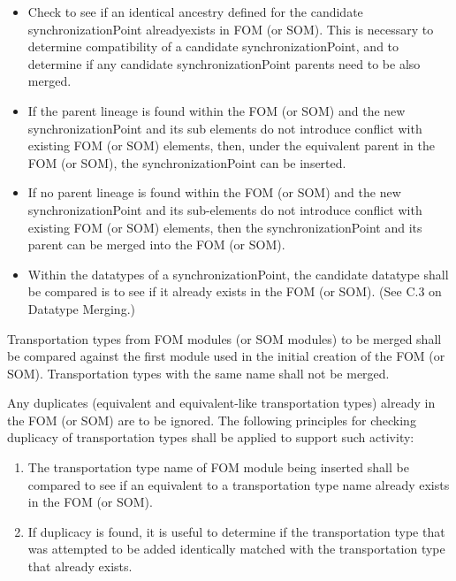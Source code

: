 \begin{itemize}[leftmargin=54pt,labelsep=12pt,itemsep=0pt,topsep=-2pt,partopsep=0pt,parsep=0pt]
\item Check to see if an identical ancestry defined for the candidate synchronizationPoint already\linebreak exists in FOM (or SOM). This is necessary to determine compatibility of a candidate synchronizationPoint, and to determine if any candidate synchronizationPoint parents need to be also merged.
\item If the parent lineage is found within the FOM (or SOM) and the new synchronizationPoint and its sub elements do not introduce conflict with existing FOM (or SOM) elements, then, under the equivalent parent in the FOM (or SOM), the synchronizationPoint can be inserted.
\item If no parent lineage is found within the FOM (or SOM) and the new synchronizationPoint and its sub-elements do not introduce conflict with existing FOM (or SOM) elements, then the synchronizationPoint and its parent can be merged into the FOM (or SOM).
\item Within the datatypes of a synchronizationPoint, the candidate datatype shall be compared is to see if it already exists in the FOM (or SOM). (See C.3 on Datatype Merging.)
\end{itemize}

\vspace{11.6pt}
Transportation types from FOM modules (or SOM modules) to be merged shall be compared against the first module used in the initial creation of the FOM (or SOM). Transportation types with the same name shall not be merged.

Any duplicates (equivalent and equivalent-like transportation types) already in the FOM (or SOM) are to be ignored. The following principles for checking duplicacy of transportation types shall be applied to support such activity:

\begin{enumerate}[leftmargin=52pt,labelsep=12pt,label=\arabic*),itemsep=0pt,topsep=0.4pt,partopsep=0pt,parsep=0pt]
\item The transportation type name of FOM module being inserted shall be compared to see if an equivalent to a transportation type name already exists in the FOM (or SOM).
\item If duplicacy is found, it is useful to determine if the transportation type that was attempted to be added identically matched with the transportation type that already exists.
\end{enumerate}
\endgroup

